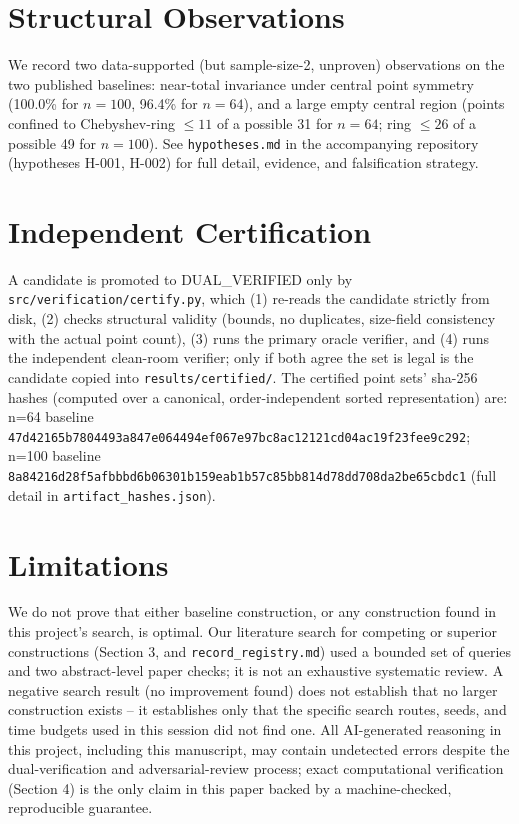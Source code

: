 \documentclass[11pt]{article}
\begin{document}
\section{Structural Observations}

We record two data-supported (but sample-size-2, unproven) observations on the two
published baselines: near-total invariance under central point symmetry (100.0\% for
$n=100$, 96.4\% for $n=64$), and a large empty central region (points confined to
Chebyshev-ring $\le 11$ of a possible 31 for $n=64$; ring $\le 26$ of a possible 49
for $n=100$). See \texttt{hypotheses.md} in the accompanying repository (hypotheses
H-001, H-002) for full detail, evidence, and falsification strategy.

\section{Independent Certification}

A candidate is promoted to DUAL\_VERIFIED only by \texttt{src/verification/certify.py},
which (1) re-reads the candidate strictly from disk, (2) checks structural validity
(bounds, no duplicates, size-field consistency with the actual point count),
(3) runs the primary oracle verifier, and (4) runs the independent clean-room
verifier; only if both agree the set is legal is the candidate copied into
\texttt{results/certified/}. The certified point sets' sha-256 hashes (computed over
a canonical, order-independent sorted representation) are: n=64 baseline
\texttt{47d42165b7804493a847e064494ef067e97bc8ac12121cd04ac19f23fee9c292}; n=100
baseline \texttt{8a84216d28f5afbbbd6b06301b159eab1b57c85bb814d78dd708da2be65cbdc1}
(full detail in \texttt{artifact\_hashes.json}).

\section{Limitations}

We do not prove that either baseline construction, or any construction found in this
project's search, is optimal. Our literature search for competing or superior
constructions (Section 3, and \texttt{record\_registry.md}) used a bounded set of
queries and two abstract-level paper checks; it is not an exhaustive systematic
review. A negative search result (no improvement found) does not establish that no
larger construction exists -- it establishes only that the specific search routes,
seeds, and time budgets used in this session did not find one. All AI-generated
reasoning in this project, including this manuscript, may contain undetected errors
despite the dual-verification and adversarial-review process; exact computational
verification (Section 4) is the only claim in this paper backed by a
machine-checked, reproducible guarantee.
\end{document}
